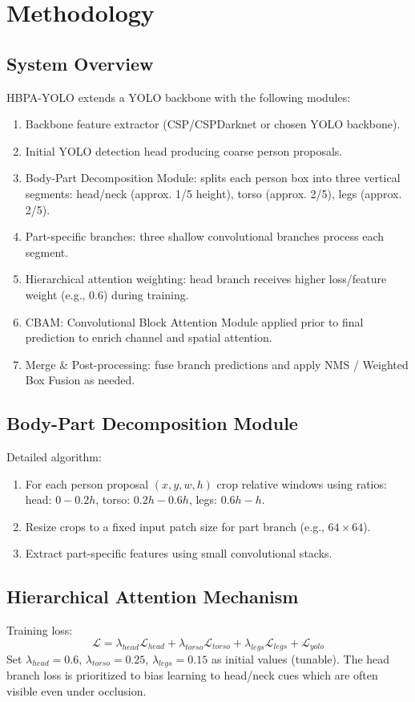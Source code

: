 \documentclass[12pt,a4paper]{report}
\begin{document}
\chapter{Methodology}

\section{System Overview}
HBPA-YOLO extends a YOLO backbone with the following modules:
\begin{enumerate}
  \item Backbone feature extractor (CSP/CSPDarknet or chosen YOLO backbone).
  \item Initial YOLO detection head producing coarse person proposals.
  \item Body-Part Decomposition Module: splits each person box into three vertical segments: head/neck (approx. 1/5 height), torso (approx. 2/5), legs (approx. 2/5).
  \item Part-specific branches: three shallow convolutional branches process each segment.
  \item Hierarchical attention weighting: head branch receives higher loss/feature weight (e.g., 0.6) during training.
  \item CBAM: Convolutional Block Attention Module applied prior to final prediction to enrich channel and spatial attention.
  \item Merge & Post-processing: fuse branch predictions and apply NMS / Weighted Box Fusion as needed.
\end{enumerate}

\section{Body-Part Decomposition Module}
Detailed algorithm:
\begin{enumerate}
  \item For each person proposal $(x,y,w,h)$ crop relative windows using ratios: head: $0 - 0.2h$, torso: $0.2h - 0.6h$, legs: $0.6h - h$.
  \item Resize crops to a fixed input patch size for part branch (e.g., $64\times64$).
  \item Extract part-specific features using small convolutional stacks.
\end{enumerate}

\section{Hierarchical Attention Mechanism}
Training loss:
\[
\mathcal{L} = \lambda_{head}\mathcal{L}_{head} + \lambda_{torso}\mathcal{L}_{torso} + \lambda_{legs}\mathcal{L}_{legs} + \mathcal{L}_{yolo}
\]
Set $\lambda_{head}=0.6$, $\lambda_{torso}=0.25$, $\lambda_{legs}=0.15$ as initial values (tunable). The head branch loss is prioritized to bias learning to head/neck cues which are often visible even under occlusion.
\end{document}
